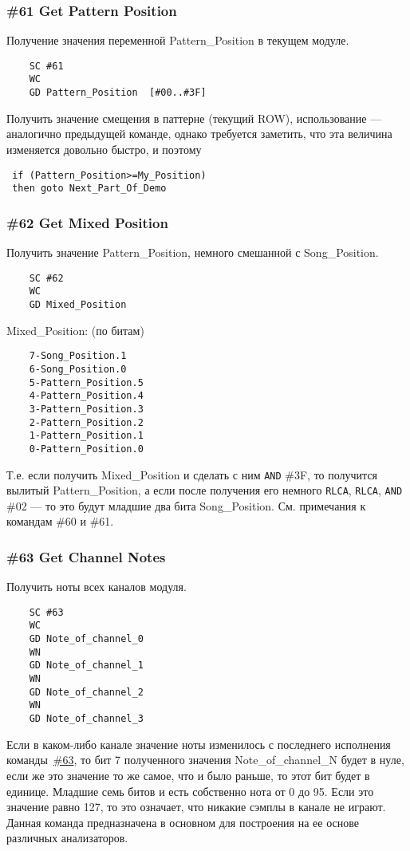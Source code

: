 \documentclass[a4paper,11pt]{article}
\begin{document}
\subsubsection{\#61 Get Pattern Position}
Получение значения переменной Pattern\_Position в текущем модуле.
\begin{verbatim}
    SC #61
    WC
    GD Pattern_Position  [#00..#3F]
\end{verbatim}

Получить значение смещения в паттерне (текущий ROW), использование --- аналогично предыдущей команде, однако требуется заметить, что эта величина изменяется довольно быстро, и поэтому
\begin{verbatim}
 if (Pattern_Position>=My_Position)
 then goto Next_Part_Of_Demo
\end{verbatim}

\subsubsection{\#62 Get Mixed Position}
Получить значение Pattern\_Position, немного смешанной с Song\_Position.
\begin{verbatim}
    SC #62
    WC
    GD Mixed_Position
\end{verbatim}

    Mixed\_Position: (по битам)
\begin{verbatim}
    7-Song_Position.1
    6-Song_Position.0
    5-Pattern_Position.5
    4-Pattern_Position.4
    3-Pattern_Position.3
    2-Pattern_Position.2
    1-Pattern_Position.1
    0-Pattern_Position.0
\end{verbatim}

Т.е. если получить Mixed\_Position и сделать с ним \texttt{AND} \#3F, то получится вылитый Pattern\_Position,
 а если после получения его немного \texttt{RLCA}, \texttt{RLCA}, \texttt{AND} \#02 --- то это будут младшие два бита Song\_Position. См. примечания к командам \#60 и \#61.

\subsubsection{\#63 Get Channel Notes\label{cmd:63}}
Получить ноты всех каналов модуля.
\begin{verbatim}
    SC #63
    WC
    GD Note_of_channel_0
    WN
    GD Note_of_channel_1
    WN
    GD Note_of_channel_2
    WN
    GD Note_of_channel_3
\end{verbatim}

Если в каком-либо канале значение ноты изменилось с последнего исполнения команды~\hyperref[cmd:63]{\#63},
то бит 7 полученного значения Note\_of\_channel\_N будет в нуле, если же это значение то же самое,
что и было раньше, то этот бит будет в единице. Младшие семь битов и есть собственно нота от 0 до 95.
Если это значение равно 127, то это означает, что никакие сэмплы в канале не играют.
Данная команда предназначена в основном для построения на ее основе различных анализаторов.
\end{document}
